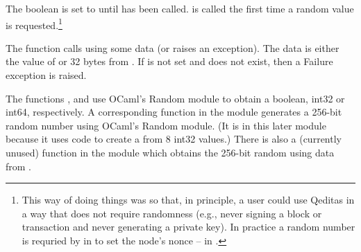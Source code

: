 The boolean {} is set to {} until {} has been called.
{} is called the first time a random value is requested.\footnote{This way of doing things was so that, in principle, a user could use Qeditas in a way that does not require randomness (e.g., never signing a block or transaction and never generating a private key). In practice a random number is requried by {} in {} to set the node's nonce -- {} in {}.}

The function {} calls {} using some data (or raises an exception).
The data is either the value of {} or 32 bytes from {}.
If {} is not set and {} does not exist, then a Failure exception is raised.

The functions {}, {} and {}
use OCaml's Random module to obtain a boolean, int32 or int64, respectively.
A corresponding function {} in the module  generates a 256-bit random number
using OCaml's Random module. (It is in this later module because it uses code to create a 
from 8 int32 values.) There is also a (currently unused) function {} in the module 
which obtains the 256-bit random  using data from {}.
